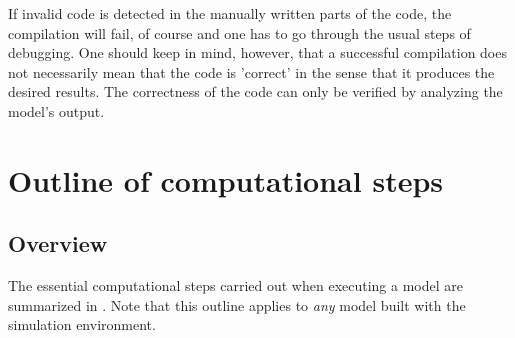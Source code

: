 If invalid code is detected in the manually written parts of the code, the compilation will fail, of course and one has to go through the usual steps of debugging. One should keep in mind, however, that a successful compilation does not necessarily mean that the code is 'correct' in the sense that it produces the desired results. The correctness of the code can only be verified by analyzing the model's output.


\FloatBarrier

\section{Outline of computational steps} \label{sec:concept-compSteps}

\subsection{Overview} \label{sec:concept-compSteps-overview}

The essential computational steps carried out when executing a model are summarized in . Note that this outline applies to \emph{any} model built with the  simulation environment.

